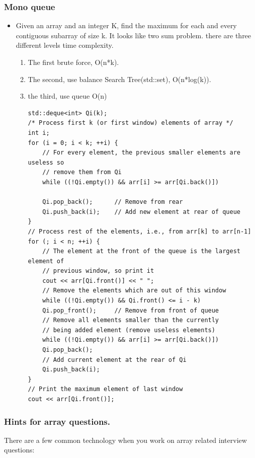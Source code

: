 \documentclass[a4paper,11pt,twoside]{book}
\begin{document}
\subsubsection{Mono queue}
\begin{itemize}
	\item Given an array and an integer K, find the maximum for each and every contiguous subarray of size k. It looks like two sum problem. there are three different levels time complexity. 
\begin{enumerate}
	\item The first brute force, O(n*k). 
	\item The second, use balance Search Tree(std::set), O(n*log(k)). 
	\item the third, use queue O(n)
\begin{lstlisting}[breaklines]
std::deque<int> Qi(k);
/* Process first k (or first window) elements of array */
int i;
for (i = 0; i < k; ++i) {
	// For every element, the previous smaller elements are useless so
	// remove them from Qi
	while ((!Qi.empty()) && arr[i] >= arr[Qi.back()])
	
	Qi.pop_back();  	// Remove from rear	
	Qi.push_back(i);    // Add new element at rear of queue
}
// Process rest of the elements, i.e., from arr[k] to arr[n-1]
for (; i < n; ++i) {
	// The element at the front of the queue is the largest element of
	// previous window, so print it
	cout << arr[Qi.front()] << " ";	
	// Remove the elements which are out of this window
	while ((!Qi.empty()) && Qi.front() <= i - k)
	Qi.pop_front();  	// Remove from front of queue	
	// Remove all elements smaller than the currently
	// being added element (remove useless elements)
	while ((!Qi.empty()) && arr[i] >= arr[Qi.back()])
	Qi.pop_back();	
	// Add current element at the rear of Qi
	Qi.push_back(i);
}
// Print the maximum element of last window
cout << arr[Qi.front()];	    
\end{lstlisting}	
	

\end{enumerate}

	
\end{itemize}


\subsubsection{Hints for array questions.}
There are a few common technology when you work on array related interview questions:
\end{document}
